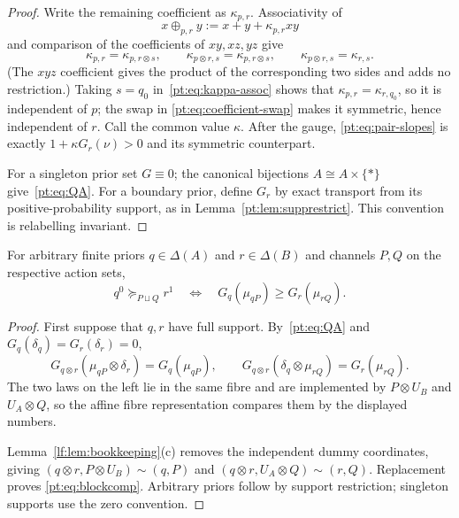 \begin{proof}
Write the remaining coefficient as $\kappa_{p,r}$.  Associativity of
\[
 x\oplus_{p,r}y:=x+y+\kappa_{p,r}xy
\]
and comparison of the coefficients of $xy,xz,yz$ give
\[
 \kappa_{p,r}=\kappa_{p,r\otimes s},\qquad
 \kappa_{p\otimes r,s}=\kappa_{p,r\otimes s},\qquad
 \kappa_{p\otimes r,s}=\kappa_{r,s}.
\tag{KA}\label{pt:eq:kappa-assoc}
\]
(The $xyz$ coefficient gives the product of the corresponding two sides and
adds no restriction.)  Taking $s=q_0$ in~\eqref{pt:eq:kappa-assoc} shows that
$\kappa_{p,r}=\kappa_{r,q_0}$, so it is independent of $p$; the swap in
\eqref{pt:eq:coefficient-swap} makes it symmetric, hence independent of $r$.
Call the common value $\kappa$.  After the gauge,
\eqref{pt:eq:pair-slopes} is exactly
$1+\kappa G_r(\nu)>0$ and its symmetric counterpart.

For a singleton prior set $G\equiv0$; the canonical bijections
$A\cong A\times\{*\}$ give~\eqref{pt:eq:QA}.  For a boundary prior, define
$G_r$ by exact transport from its positive-probability support, as in
Lemma~\ref{pt:lem:supprestrict}.  This convention is relabelling invariant.
\end{proof}

\begin{lemma}
\label{pt:lem:blockbridge}
For arbitrary finite priors $q\in\Delta(A)$ and $r\in\Delta(B)$ and channels
$P,Q$ on the respective action sets,
\begin{equation}
 q^0\succeq_{P\sqcup Q}r^1
 \quad\Longleftrightarrow\quad
 G_q(\mu_{qP})\ge G_r(\mu_{rQ}).
\tag{BC}\label{pt:eq:blockcomp}
\end{equation}
\end{lemma}

\begin{proof}
First suppose that $q,r$ have full support.  By~\eqref{pt:eq:QA} and
$G_q(\delta_q)=G_r(\delta_r)=0$,
\[
 G_{q\otimes r}(\mu_{qP}\otimes\delta_r)=G_q(\mu_{qP}),
 \qquad
 G_{q\otimes r}(\delta_q\otimes\mu_{rQ})=G_r(\mu_{rQ}).
\]
The two laws on the left lie in the same fibre and are implemented by
$P\otimes U_B$ and $U_A\otimes Q$, so the affine fibre representation
compares them by the displayed numbers.

Lemma~\ref{lf:lem:bookkeeping}\textup{(c)} removes the independent dummy
coordinates, giving
$(q\otimes r,P\otimes U_B)\sim(q,P)$ and
$(q\otimes r,U_A\otimes Q)\sim(r,Q)$.  Replacement proves
\eqref{pt:eq:blockcomp}.  Arbitrary priors follow by support restriction;
singleton supports use the zero convention.
\end{proof}

